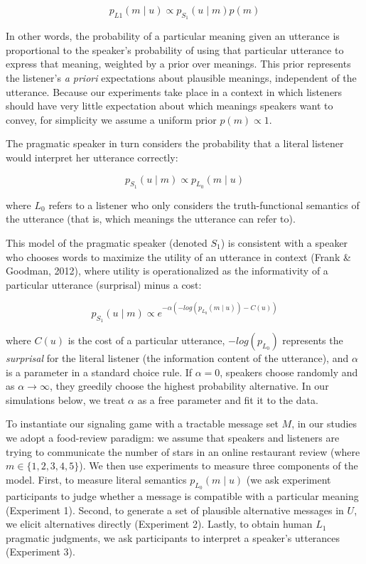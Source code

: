 \documentclass[10pt, letterpaper]{article}
\begin{document}
\[p_{L1}(m \mid u) \propto p_{S_1} (u \mid m) p(m)\]

\noindent In other words, the probability of a particular meaning given
an utterance is proportional to the speaker's probability of using that
particular utterance to express that meaning, weighted by a prior over
meanings. This prior represents the listener's \emph{a priori}
expectations about plausible meanings, independent of the utterance.
Because our experiments take place in a context in which listeners
should have very little expectation about which meanings speakers want
to convey, for simplicity we assume a uniform prior \(p(m) \propto 1\).

The pragmatic speaker in turn considers the probability that a literal
listener would interpret her utterance correctly:

\[ p_{S_1}(u \mid m) \propto p_{L_0} (m \mid u)\]

\noindent where \(L_0\) refers to a listener who only considers the
truth-functional semantics of the utterance (that is, which meanings the
utterance can refer to).

This model of the pragmatic speaker (denoted \(S_1\)) is consistent with
a speaker who chooses words to maximize the utility of an utterance in
context (Frank \& Goodman, 2012), where utility is operationalized as
the informativity of a particular utterance (surprisal) minus a cost:

\[p_{S_1}(u \mid m) \propto e^{-\alpha(-log(p_{L_0}(m \mid u)) - C(u))}\]

\noindent where \(C(u)\) is the cost of a particular utterance,
\(-log(p_{L_0})\) represents the \emph{surprisal} for the literal
listener (the information content of the utterance), and \(\alpha\) is a
parameter in a standard choice rule. If \(\alpha=0\), speakers choose
randomly and as \(\alpha \rightarrow \infty\), they greedily choose the
highest probability alternative. In our simulations below, we treat
\(\alpha\) as a free parameter and fit it to the data.

To instantiate our signaling game with a tractable message set \(M\), in
our studies we adopt a food-review paradigm: we assume that speakers and
listeners are trying to communicate the number of stars in an online
restaurant review (where \(m \in \{1, 2, 3, 4, 5\}\)). We then use
experiments to measure three components of the model. First, to measure
literal semantics \({p_{L_0} (m \mid u)}\) (we ask experiment
participants to judge whether a message is compatible with a particular
meaning (Experiment 1). Second, to generate a set of plausible
alternative messages in \(U\), we elicit alternatives directly
(Experiment 2). Lastly, to obtain human \(L_1\) pragmatic judgments, we
ask participants to interpret a speaker's utterances (Experiment 3).
\end{document}
